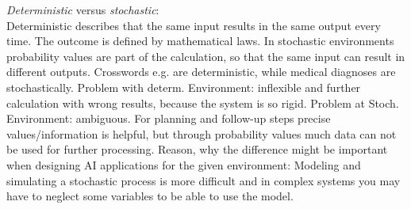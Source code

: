 \documentclass[10pt,a4paper]{article}
\begin{document}
		\noindent \textit{Deterministic} versus \textit{stochastic}:
		\\
		Deterministic describes that the same input results in the same output every time. The outcome is defined by mathematical laws.
		In stochastic environments probability values are part of the calculation, so that the same input can result in different outputs.
		Crosswords e.g. are deterministic, while medical diagnoses are stochastically. Problem with determ. Environment: inflexible and further calculation with wrong results, because the system is so rigid. Problem at Stoch. Environment: ambiguous. For planning and follow-up steps precise values/information is helpful, but through probability values much data can not be used for further processing.
		Reason, why the difference might be important when designing AI applications for the given environment:
		Modeling and simulating a stochastic process is more difficult and in complex systems you may have to neglect some variables to be able to use the model.



		
		
		
\end{document}
